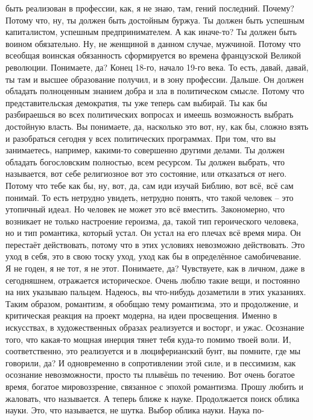 быть реализован в профессии, как, я не знаю, там, гений последний. Почему?
Потому что, ну, ты должен быть достойным буржуа. Ты должен быть успешным
капиталистом, успешным предпринимателем. А как иначе-то? Ты должен быть воином
обязательно. Ну, не женщиной в данном случае, мужчиной. Потому что всеобщая
воинская обязанность сформируется во времена французской Великой революции.
Понимаете, да? Конец 18-го, начало 19-го века. То есть, давай, давай, ты там и
высшее образование получил, и в зону профессии. Дальше. Он должен обладать
полноценным знанием добра и зла в политическом смысле. Потому что
представительская демократия, ты уже теперь сам выбирай. Ты как бы разбираешься
во всех политических вопросах и имеешь возможность выбрать достойную власть. Вы
понимаете, да, насколько это вот, ну, как бы, сложно взять и разобраться сегодня
у всех политических программах. При том, что вы занимаетесь, например, какими-то
совершенно другими делами. Ты должен обладать богословским полностью, всем
ресурсом. Ты должен выбрать, что называется, вот себе религиозное вот это
состояние, или отказаться от него. Потому что тебе как бы, ну, вот, да, сам иди
изучай Библию, вот всё, всё сам понимай. То есть нетрудно увидеть, нетрудно
понять, что такой человек – это утопичный идеал. Но человек не может это всё
вместить. Закономерно, что возникает не только настроение героизма, да, такой
тип героического человека, но и тип романтика, который устал. Он устал на его
плечах всё время мира. Он перестаёт действовать, потому что в этих условиях
невозможно действовать. Это уход в себя, это в свою тоску уход, уход как бы в
определённое самобичевание. Я не годен, я не тот, я не этот. Понимаете, да?
Чувствуете, как в личном, даже в сегодняшнем, отражается историческое. Очень
люблю такие вещи, и постоянно на них указываю пальцем. Надеюсь, вы что-нибудь
дозаметили в этих указаниях. Таким образом, романтизм, я обобщаю тему
романтизма, это и продолжение, и критическая реакция на проект модерна, на идеи
просвещения. Именно в искусствах, в художественных образах реализуется и
восторг, и ужас. Осознание того, что какая-то мощная инерция тянет тебя куда-то
помимо твоей воли. И, соответственно, это реализуется и в люциферианский бунт,
вы помните, где мы говорили, да? И одновременно в сопротивлении этой силе, и в
пессимизм, как осознание невозможности, просто ты плывёшь по течению. Вот очень
богатое время, богатое мировоззрение, связанное с эпохой романтизма. Прошу
любить и жаловать, что называется. А теперь ближе к науке. Продолжается поиск
облика науки. Это, что называется, не шутка. Выбор облика науки. Наука по-
